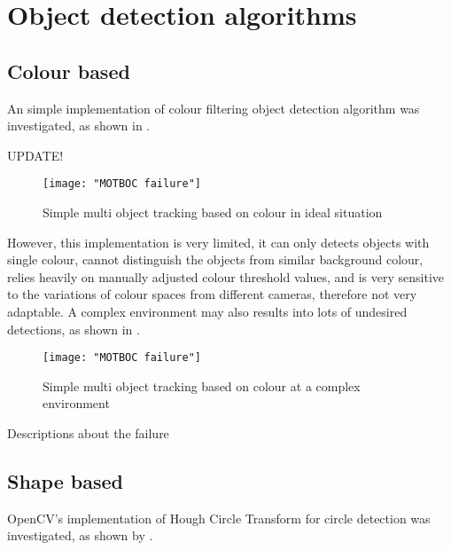 \section{Object detection algorithms}

\subsection{Colour based}

An simple implementation \cite{MOTBOC.git} of colour filtering object detection algorithm was investigated, as shown in .

{\color{red}UPDATE!}
\begin{figure}[H]
  \centering
  \texttt{[image: "MOTBOC failure"]}
  \caption{Simple multi object tracking based on colour \cite{MOTBOC.git} in ideal situation}
  \label{Figure:MOTBOC_F}
\end{figure}

However, this implementation is very limited, it can only detects objects with single colour, cannot distinguish the objects from similar background colour, relies heavily on manually adjusted colour threshold values, and is very sensitive to the variations of colour spaces from different cameras, therefore not very adaptable. A complex environment may also results into lots of undesired detections, as shown in .

\begin{figure}[H]
  \centering
  \texttt{[image: "MOTBOC failure"]}
  \caption{Simple multi object tracking based on colour \cite{MOTBOC.git} at a complex environment}
  \label{Figure:MOTBOC_F}
\end{figure}

{\color{red}Descriptions about the failure}

\subsection{Shape based}

OpenCV's implementation of Hough Circle Transform for circle detection was investigated, as shown by .


